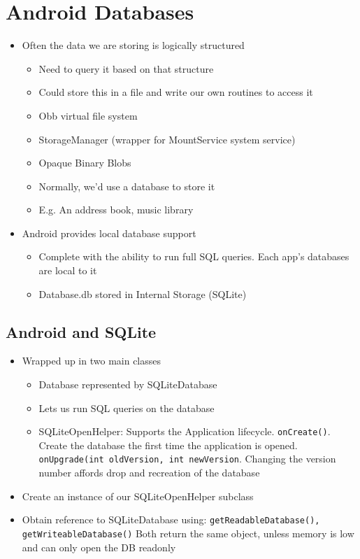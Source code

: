 \documentclass{article}
\begin{document}
\section{Android Databases}

\begin{itemize}
  \item Often the data we are storing is logically structured
  \begin{itemize}
    \item Need to query it based on that structure 
    \item Could store this in a file and write our own routines to access it 
    \item Obb virtual file system 
    \item StorageManager (wrapper for MountService system service) 
    \item Opaque Binary Blobs 
    \item Normally, we’d use a database to store it 
    \item E.g. An address book, music library
  \end{itemize}
  \item Android provides local database support
  \begin{itemize}
    \item Complete with the ability to run full SQL queries. Each app’s databases are local to it 
    \item Database.db stored in Internal Storage (SQLite)
  \end{itemize}
\end{itemize}

\subsection{Android and SQLite}

\begin{itemize}
  \item Wrapped up in two main classes
  \begin{itemize}
    \item Database represented by SQLiteDatabase 
    \item Lets us run SQL queries on the database 
    \item SQLiteOpenHelper: Supports the Application lifecycle. \verb|onCreate()|. Create the database the first time the application is opened. \verb|onUpgrade(int oldVersion, int newVersion|. Changing the version number affords drop and recreation of the database
  \end{itemize}
  \item Create an instance of our SQLiteOpenHelper subclass 
  \item Obtain reference to SQLiteDatabase using: \verb|getReadableDatabase(), getWriteableDatabase()| Both return the same object, unless memory is low and can only open the DB readonly
\end{itemize}
\end{document}
